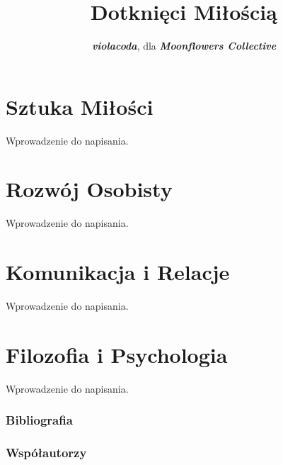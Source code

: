 \documentclass[]{coda-art}
\title{Dotknięci Miłością}
\author{\textbf{\emph{violacoda}}, dla \textbf{\emph{Moonflowers Collective}}}
\begin{document}
\maketitle
\tableofcontents


\clearpage\part{Sztuka Miłości}
\label{sztuka-milosci}

Wprowadzenie do napisania.

\clearpage



\clearpage\part{Rozwój Osobisty}
\label{rozwoj-osobisty}

Wprowadzenie do napisania.



\clearpage\part{Komunikacja i Relacje}
\label{komunikacja-relacje}

Wprowadzenie do napisania.



\clearpage\part{Filozofia i Psychologia}
\label{filozofia}

Wprowadzenie do napisania.



\clearpage\section*{Bibliografia}
\label{bibliografia}



\clearpage\section*{Współautorzy}
\label{wspolautorzy}
\end{document}
